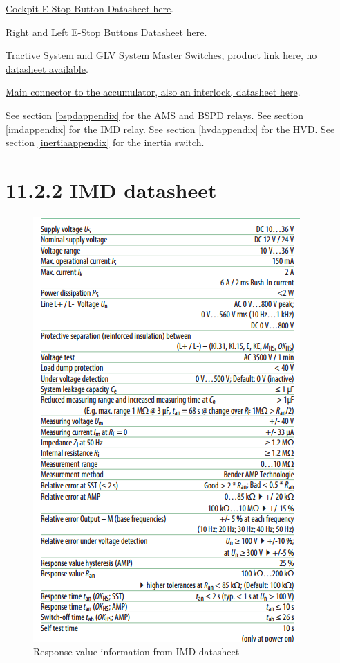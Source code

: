 \documentclass{article}
\begin{document}
{\href{http://products.eao.com/index.php?IdTreeGroup=2344&IdProduct=48667&lang=en}{Cockpit E-Stop Button Datasheet here}.

\href{http://products.eao.com/index.php?IdTreeGroup=2344&IdProduct=48533&lang=en}{Right and Left E-Stop Buttons Datasheet here}.

\href{http://www.amazon.com/Volt-Battery-Disconnect-Kill-Switch/dp/B007O0BBFM}{Tractive System and GLV System Master Switches, product link here, no datasheet available}.

\href{http://www.mouser.com/pdfdocs/9876510101.PDF}{Main connector to the accumulator, also an interlock, datasheet here}.

See section \ref{bspdappendix} for the AMS and BSPD relays.
See section \ref{imdappendix} for the IMD relay.
See section \ref{hvdappendix} for the HVD.
See section \ref{inertiaappendix} for the inertia switch.

\section*{11.2.2 IMD datasheet} \label{imdappendix}
\begin{figure}[H]
    \centering
    \includegraphics[width=0.45 \textheight]{IMD_datasheet_snip}
    \caption{Response value information from IMD datasheet}
    \label{IMDresponsetime}
\end{figure}

}
\end{document}
